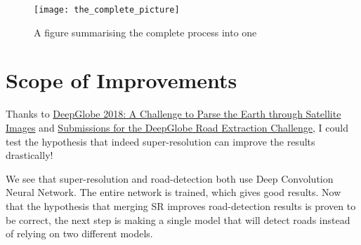\begin{sidewaysfigure}
  \centering
  \texttt{[image: the\_complete\_picture]}
  \caption{A figure summarising the complete process into one}
  \label{fig:the_complete_picture}
\end{sidewaysfigure}

\chapter{Scope of Improvements}

Thanks to \href{https://arxiv.org/pdf/1805.06561.pdf}{DeepGlobe 2018: A Challenge to Parse the Earth through Satellite Images} and \href{http://openaccess.thecvf.com/content_cvpr_2018_workshops/papers/w4/Zhou_D-LinkNet_LinkNet_With_CVPR_2018_paper.pdf}{Submissions for the DeepGlobe Road Extraction Challenge}, I could test the hypothesis that indeed super-resolution can improve the results drastically!

We see that super-resolution and road-detection both use Deep Convolution Neural Network. The entire network is trained, which gives good results. Now that the hypothesis that merging SR improves road-detection results is proven to be correct, the next step is making a single model that will detect roads instead of relying on two different models.

\pagebreak
